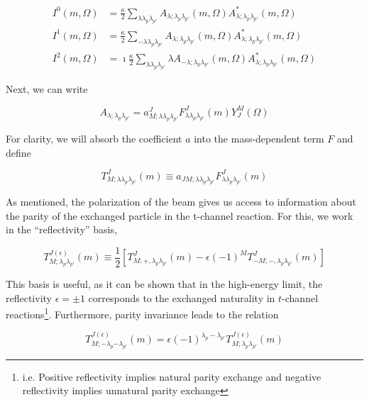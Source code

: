 \begin{align}
  I^0(m,\Omega) &= \frac{\kappa}{2}\sum_{\lambda\lambda_p\lambda_{p'}} A_{\lambda;\lambda_p\lambda_{p'}}(m,\Omega)A^*_{\lambda;\lambda_p\lambda_{p'}}(m,\Omega) \\
  I^1(m,\Omega) &= \frac{\kappa}{2}\sum_{-\lambda\lambda_p\lambda_{p'}} A_{\lambda;\lambda_p\lambda_{p'}}(m,\Omega)A^*_{\lambda;\lambda_p\lambda_{p'}}(m,\Omega) \\
  I^2(m,\Omega) &= \imath\frac{\kappa}{2}\sum_{\lambda\lambda_p\lambda_{p'}} \lambda A_{-\lambda;\lambda_p\lambda_{p'}}(m,\Omega)A^*_{\lambda;\lambda_p\lambda_{p'}}(m,\Omega)
\end{align}

Next, we can write

\begin{equation}
  A_{\lambda;\lambda_p\lambda_{p'}} = a^J_{M;\lambda\lambda_p\lambda_{p'}} F^J_{\lambda\lambda_p\lambda_{p'}}(m) Y_J^M(\Omega)
\end{equation}

For clarity, we will absorb the coefficient $a$ into the mass-dependent term $F$ and define

\begin{equation}
  T^{J}_{M;\lambda\lambda_p\lambda_{p'}}(m) \equiv a_{JM;\lambda\lambda_p\lambda_{p'}} F^J_{\lambda\lambda_p\lambda_{p'}}(m)
  \label{eq:amplitude-definition}
\end{equation}

As mentioned, the polarization of the beam gives us access to information about the parity of the exchanged particle in the t-channel reaction. For this, we work in the ``reflectivity'' basis,

\begin{equation}
  T^{J(\epsilon)}_{M;\lambda_p\lambda_{p'}}(m) \equiv \frac{1}{2} \left[T^J_{M;+,\lambda_p\lambda_{p'}}(m) - \epsilon(-1)^M T^J_{-M;-,\lambda_p\lambda_{p'}}(m)\right]
  \label{eq:reflectivity-amplitude}
\end{equation}

This basis is useful, as it can be shown that in the high-energy limit, the reflectivity $\epsilon=\pm 1$ corresponds to the exchanged naturality in $t$-channel reactions\footnote{i.e. Positive reflectivity implies natural parity exchange and negative reflectivity implies unnatural parity exchange}. Furthermore, parity invariance leads to the relation

\begin{equation}
  T^{J(\epsilon)}_{M;-\lambda_p{-\lambda_{p'}}}(m) = \epsilon(-1)^{\lambda_p-\lambda_{p'}}T^{J(\epsilon)}_{M;\lambda_p\lambda_{p'}}(m)
  \label{eq:nucleon-parity-invariance}
\end{equation}

